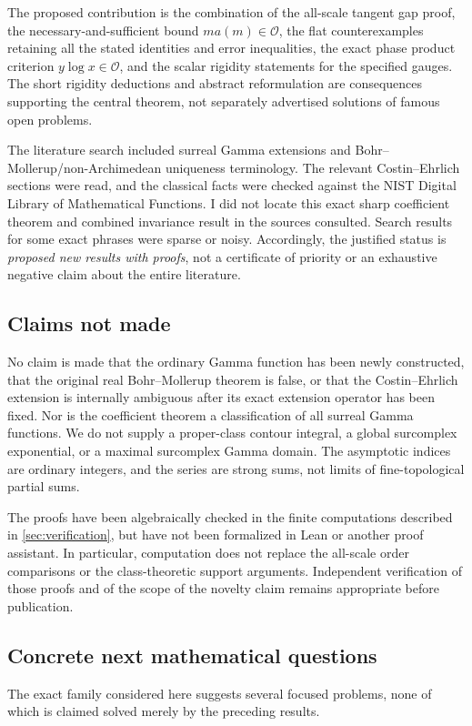 \documentclass[11pt,letterpaper]{article}
\numberwithin{equation}{section}
\theoremstyle{plain}
\theoremstyle{definition}
\theoremstyle{remark}
\newcommand{\Ocal}{\mathcal O}
\begin{document}
The proposed contribution is the combination of the all-scale tangent gap
proof, the necessary-and-sufficient bound $m a(m)\in\Ocal$, the flat
counterexamples retaining all the stated identities and error inequalities,
the exact phase product criterion $y\log x\in\Ocal$, and the scalar
rigidity statements for the specified gauges. The short rigidity deductions
and abstract reformulation are consequences supporting the central theorem,
not separately advertised solutions of famous open problems.

The literature search included surreal Gamma extensions and
Bohr--Mollerup/non-Archimedean uniqueness terminology. The relevant
Costin--Ehrlich sections were read, and the classical facts were checked
against the NIST Digital Library of Mathematical Functions. I did not locate
this exact sharp coefficient theorem and combined invariance result in the
sources consulted. Search results for some exact phrases were sparse or
noisy. Accordingly, the justified status is \emph{proposed new results with
proofs}, not a certificate of priority or an exhaustive negative claim about
the entire literature.

\subsection{Claims not made}
No claim is made that the ordinary Gamma function has been newly constructed,
that the original real Bohr--Mollerup theorem is false, or that the
Costin--Ehrlich extension is internally ambiguous after its exact extension
operator has been fixed. Nor is the coefficient theorem a classification
of all surreal Gamma functions. We do not supply a proper-class contour
integral, a global surcomplex exponential, or a maximal surcomplex Gamma
domain. The asymptotic indices are ordinary integers, and the series are
strong sums, not limits of fine-topological partial sums.

The proofs have been algebraically checked in the finite computations
described in \cref{sec:verification}, but have not been formalized in Lean
or another proof assistant. In particular, computation does not replace the
all-scale order comparisons or the class-theoretic support arguments.
Independent verification of those proofs and of the scope of the novelty
claim remains appropriate before publication.

\subsection{Concrete next mathematical questions}
The exact family considered here suggests several focused problems, none of
which is claimed solved merely by the preceding results.
\end{document}
